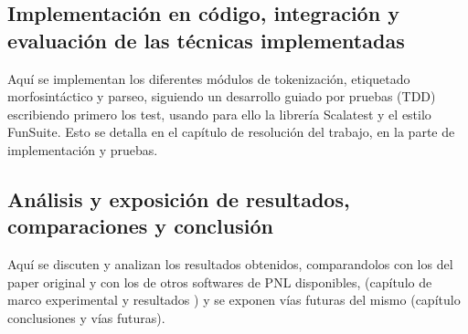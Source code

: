 \subsection*{Implementación en código, integración y evaluación de las técnicas implementadas}
Aquí se implementan los diferentes módulos de tokenización, etiquetado morfosintáctico y parseo, siguiendo un desarrollo guiado por pruebas (TDD) escribiendo primero los test, usando para ello la librería Scalatest y el estilo FunSuite. Esto se detalla en el capítulo de resolución del trabajo, en la parte de implementación y pruebas. 

\subsection*{Análisis y exposición de resultados, comparaciones y conclusión}   
Aquí se discuten y analizan los resultados obtenidos, comparandolos con los del paper original y con los de otros softwares de PNL disponibles, (capítulo de marco experimental y resultados ) y se exponen vías futuras del mismo (capítulo conclusiones y vías futuras).


